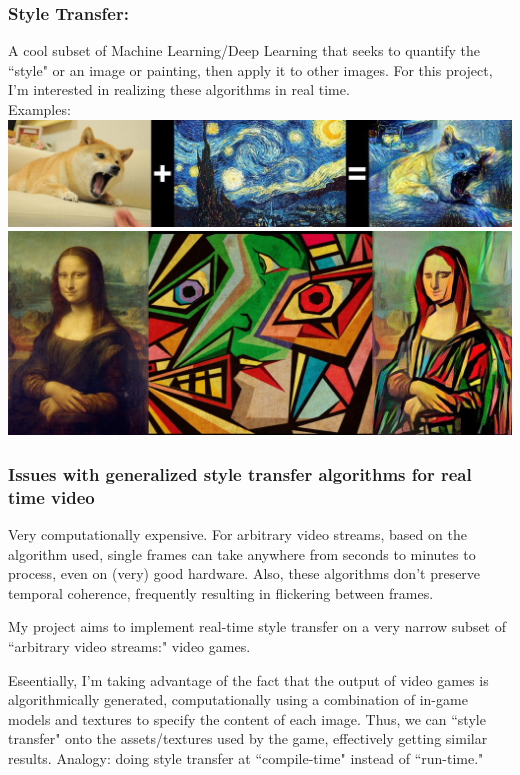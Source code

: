 \documentclass[12pt]{article}
\begin{document}
    \subsubsection{Style Transfer:}
    A cool subset of Machine Learning/Deep Learning that seeks to quantify the ``style" or an image or painting, then apply it to other images. 
    For this project, I'm interested in realizing these algorithms in real time.\\
    Examples: \\
    \includegraphics[width=\columnwidth]{ex1.jpg}\\
    \includegraphics[width=\columnwidth]{ex2.jpg}

    \subsubsection{Issues with generalized style transfer algorithms for real time video}
    
    Very computationally expensive. For arbitrary video streams, based on the algorithm used, single frames can take anywhere from seconds to minutes to process, even on (very) good hardware.
    Also, these algorithms don't preserve temporal coherence, frequently resulting in flickering between frames. 

    My project aims to implement real-time style transfer on a very narrow subset of ``arbitrary video streams:" video games.

    Eseentially, I'm taking advantage of the fact that the output of video games is algorithmically generated, computationally using a combination of in-game models and textures to specify the content of each image.
    Thus, we can ``style transfer" onto the assets/textures used by the game, effectively getting similar results. 
    Analogy: doing style transfer at ``compile-time" instead of ``run-time."
\end{document}
